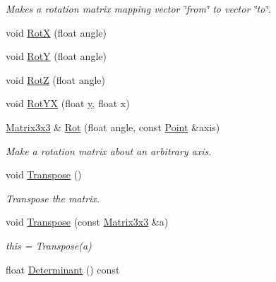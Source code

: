 \begin{DoxyCompactItemize}
\begin{DoxyCompactList}\small\item\em Makes a rotation matrix mapping vector \char`\"{}from\char`\"{} to vector \char`\"{}to\char`\"{}. \end{DoxyCompactList}\item 
void \hyperlink{classOpcode_1_1Matrix3x3_a22af89dd49400b7a830e67170b79632c}{RotX} (float angle)
\item 
void \hyperlink{classOpcode_1_1Matrix3x3_afc54cf83b38e86f63a101da930e5747a}{RotY} (float angle)
\item 
void \hyperlink{classOpcode_1_1Matrix3x3_acd72e96efec43115787ee429b4f00aa5}{RotZ} (float angle)
\item 
void \hyperlink{classOpcode_1_1Matrix3x3_a55cd22b34744d419faa867e5caa8fb83}{Rot\+YX} (float \hyperlink{IceUtils_8h_aa7ffaed69623192258fb8679569ff9ba}{y}, float x)
\item 
\hyperlink{classOpcode_1_1Matrix3x3}{Matrix3x3} \& \hyperlink{classOpcode_1_1Matrix3x3_aeada1d1ea03d2ad4763c36ef6417c83e}{Rot} (float angle, const \hyperlink{classOpcode_1_1Point}{Point} \&axis)\hypertarget{classOpcode_1_1Matrix3x3_aeada1d1ea03d2ad4763c36ef6417c83e}{}\label{classOpcode_1_1Matrix3x3_aeada1d1ea03d2ad4763c36ef6417c83e}

\begin{DoxyCompactList}\small\item\em Make a rotation matrix about an arbitrary axis. \end{DoxyCompactList}\item 
void \hyperlink{classOpcode_1_1Matrix3x3_ade81a1585f23a460384355d837f9d232}{Transpose} ()\hypertarget{classOpcode_1_1Matrix3x3_ade81a1585f23a460384355d837f9d232}{}\label{classOpcode_1_1Matrix3x3_ade81a1585f23a460384355d837f9d232}

\begin{DoxyCompactList}\small\item\em Transpose the matrix. \end{DoxyCompactList}\item 
void \hyperlink{classOpcode_1_1Matrix3x3_a215ef6339121dabfec9d45bf5e34170a}{Transpose} (const \hyperlink{classOpcode_1_1Matrix3x3}{Matrix3x3} \&a)\hypertarget{classOpcode_1_1Matrix3x3_a215ef6339121dabfec9d45bf5e34170a}{}\label{classOpcode_1_1Matrix3x3_a215ef6339121dabfec9d45bf5e34170a}

\begin{DoxyCompactList}\small\item\em this = Transpose(a) \end{DoxyCompactList}\item 
float \hyperlink{classOpcode_1_1Matrix3x3_a44176cb05a614bbe477b35881a7e7f48}{Determinant} () const \hypertarget{classOpcode_1_1Matrix3x3_a44176cb05a614bbe477b35881a7e7f48}{}\label{classOpcode_1_1Matrix3x3_a44176cb05a614bbe477b35881a7e7f48}


\end{DoxyCompactItemize}
